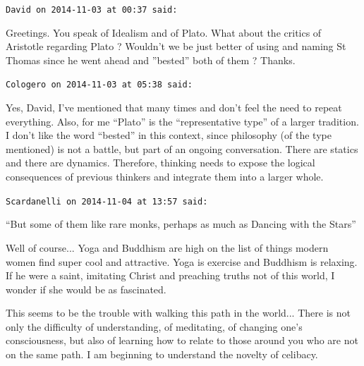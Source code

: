 \begin{footnotesize}
\begin{sffamily}
\texttt{David on 2014-11-03 at 00:37 said:}

Greetings. You speak of Idealism and of Plato. What about the critics of Aristotle regarding Plato ? Wouldn't we be just better of using and naming St Thomas since he went ahead and ''bested'' both of them ? Thanks.

\hfill

\texttt{Cologero on 2014-11-03 at 05:38 said:}

Yes, David, I've mentioned that many times and don't feel the need to repeat everything. Also, for me ``Plato'' is the ``representative type'' of a larger tradition. I don't like the word ``bested'' in this context, since philosophy (of the type mentioned) is not a battle, but part of an ongoing conversation. There are statics and there are dynamics. Therefore, thinking needs to expose the logical consequences of previous thinkers and integrate them into a larger whole.


\hfill

\texttt{Scardanelli on 2014-11-04 at 13:57 said:}

``But some of them like rare monks, perhaps as much as Dancing with the Stars''

Well of course... Yoga and Buddhism are high on the list of things modern women find super cool and attractive. Yoga is exercise and Buddhism is relaxing. If he were a saint, imitating Christ and preaching truths not of this world, I wonder if she would be as fascinated.

This seems to be the trouble with walking this path in the world... There is not only the difficulty of understanding, of meditating, of changing one's consciousness, but also of learning how to relate to those around you who are not on the same path. I am beginning to understand the novelty of celibacy.

\hfill

\end{sffamily}
\end{footnotesize}

